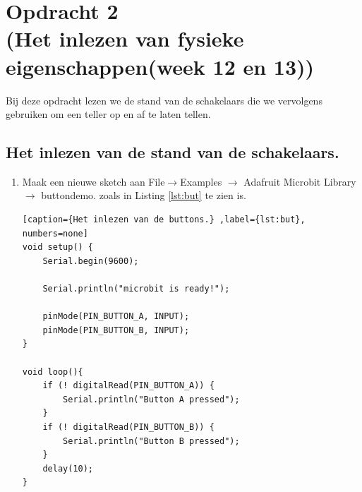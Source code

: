 \chapter{Opdracht 2\\  \small (Het inlezen van fysieke eigenschappen(week 12 en 13))} \label{sec:invoer}


Bij deze opdracht lezen we de stand van de schakelaars die we vervolgens gebruiken om een teller op en af te laten tellen.

\section{Het inlezen van de stand van de schakelaars.}\label{sec:but}
\begin{enumerate}[label=\alph*)]
	\item 
Maak een nieuwe sketch aan File$\rightarrow$Examples $\rightarrow$ Adafruit Microbit Library $\rightarrow$ buttondemo. zoals in Listing \ref{lst:but} te zien is.

\begin{lstlisting}[caption={Het inlezen van de buttons.} ,label={lst:but}, numbers=none]
void setup() {  
	Serial.begin(9600);
	
	Serial.println("microbit is ready!");
	
	pinMode(PIN_BUTTON_A, INPUT);
	pinMode(PIN_BUTTON_B, INPUT);
}

void loop(){
	if (! digitalRead(PIN_BUTTON_A)) {
		Serial.println("Button A pressed");
	}
	if (! digitalRead(PIN_BUTTON_B)) {
		Serial.println("Button B pressed");
	}
	delay(10);
}
\end{lstlisting}


\end{enumerate}
